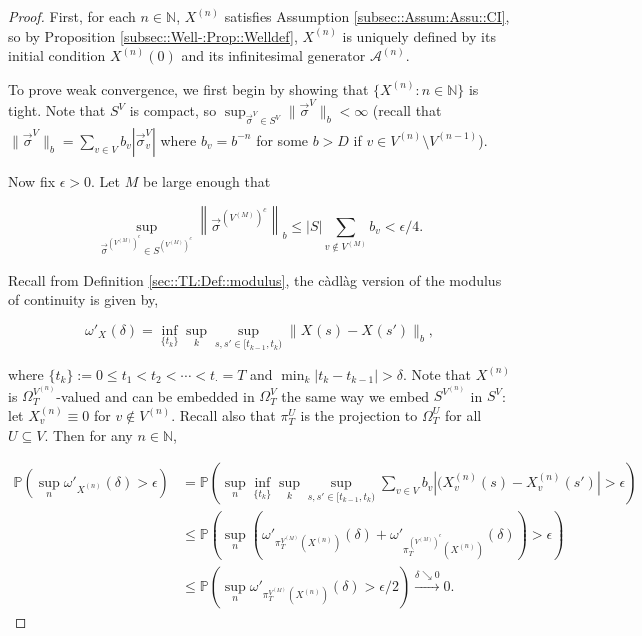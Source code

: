 \documentclass[12pt]{article}
\newcommand{\mb}{\mathbb}
\newcommand{\mc}{\mathcal}
\newcommand{\ra}{\rightarrow}
\newcommand{\os}{\overset}
\newcommand{\ep}{\epsilon}
\newcommand{\ind}{\hspace{24pt}}
\newcommand{\pr}{\mb{P}}							%
\renewcommand{\v}{v}							%
\renewcommand{\U}{U}							%
\renewcommand{\S}{S}							%
\newcommand{\s}{\sigma}							%
\newcommand{\sv}{\vec{\s}}						%
\renewcommand{\b}{b}							%
\newcommand{\T}{T}								%
\renewcommand{\t}{t}							%
\newcommand{\sset}{\Omega}						%
\newcommand{\proj}{\pi}							%
\renewcommand{\tt}{s}							%
\newcommand{\ttt}{s'}							%
\newcommand{\X}{X}								%
\newcommand{\IG}{\mc{A}}						%
\newcommand{\carp}[1]{^{#1}}					%
\newcommand{\vsi}[1]{^{#1}}						%
\newcommand{\cind}[1]{_{#1}}					%
\newcommand{\tp}[1]{(#1)}						%
\newcommand{\tip}[1]{#1}						%
\newcommand{\ts}[1]{_{#1}}						%
\newcommand{\degr}{D}							%
\newcommand{\sln}[1]{^{(#1)}}						%
\newcommand{\cconst}{M}							%
\newcommand{\cmodu}{\omega'}					%
\newcommand{\pra}[1]{_{#1}}						%
\newcommand{\indx}[1]{_{#1}}					%
\renewcommand{\it}{k}							%
\begin{document}
\begin{proof}
First, for each \(n\in\mb{N}\), \(\X\sln{n}\cind{}\tip{}\) satisfies Assumption \ref{subsec::Assum:Assu::CI}, so by Proposition \ref{subsec::Well-:Prop::Welldef}, \(\X\sln{n}\cind{}\tip{}\) is uniquely defined by its initial condition \(\X\sln{n}\cind{}\tp{0}\) and its infinitesimal generator \(\IG\sln{n}\).

\ind To prove weak convergence, we first begin by showing that \(\{\X\sln{n}\cind{}\tip{}:n\in \mb{N}\}\) is tight. Note that \(\S\carp{V}\) is compact, so \(\sup_{\sv\cind{}\vsi{V} \in \S\carp{V}} \|\sv\cind{}\vsi{V}\|_{\b} < \infty\) (recall that \(\|\sv\cind{}\vsi{V}\|_{\b} = \sum_{\v \in V} \b\cind{\v} |\sv\cind{\v}\vsi{V}|\) where \(\b\cind{\v} = \b^{-n}\) for some \(\b > \degr\) if \(\v \in V\sln{n}\setminus V\sln{n-1}\)).

\ind Now fix \(\ep > 0\). Let \(\cconst\) be large enough that

\[\sup_{\sv\cind{}\vsi{\left(V\sln{\cconst}\right)^c} \in \S\carp{\left(V\sln{\cconst}\right)^c}} \left\|\sv\cind{}\vsi{\left(V\sln{\cconst}\right)^c}\right\|_{\b} \leq |\S|\sum_{\v \notin V\sln{\cconst}} \b\cind{\v} < \ep/4.\]

Recall from Definition \ref{sec::TL:Def::modulus}, the c\`adl\`ag version of the modulus of continuity is given by,

\[\cmodu\pra{\X\cind{}\tip{}}(\delta) = \inf_{\{\t\indx{\it}\}} \sup_\it \sup_{\tt,\ttt \in [\t\indx{\it-1},\t\indx{\it})} \|\X\cind{}\tp{\tt} - \X\cind{}\tp{\ttt}\|_{\b},\]

where \(\{\t\indx{\it}\} := 0 \leq \t\indx{1} < \t\indx{2} < \cdots < \t\indx{\cdot} = \T\) and \(\min_\it|\t\indx{\it} - \t\indx{\it-1}| > \delta\). Note that \(\X\sln{n}\cind{}\tip{}\) is \(\sset\vsi{V\sln{n}}\ts{\T}\)-valued and can be embedded in \(\sset\vsi{V}\ts{\T}\) the same way we embed \(\S\carp{V\sln{n}}\) in \(\S\carp{V}\): let \(\X\sln{n}\cind{\v}\tip{} \equiv 0\) for \(\v \notin V\sln{n}\). Recall also that \(\proj\vsi{\U}\ts{\T}\) is the projection to \(\sset\vsi{\U}\ts{\T}\) for all \(\U\subseteq V\). Then for any \(n\in \mb{N}\),

\begin{align*}
\pr\left(\sup_n \cmodu\pra{\X\sln{n}\cind{}\tip{}}(\delta) > \epsilon\right) &= \pr\left(\sup_n\inf_{\{\t\indx{\it}\}}\sup_\it\sup_{\tt,\ttt \in [\t\indx{\it-1},\t\indx{\it})} \sum_{\v \in V} \b\cind{\v}|(\X\sln{n}\cind{\v}\tp{\tt} - \X\sln{n}\cind{\v}\tp{\ttt}| > \epsilon \right)\\
&\leq \pr\left(\sup_n \left(\cmodu\pra{\proj\vsi{V\sln{\cconst}}\ts{\T}(\X\sln{n}\cind{}\tip{})}(\delta) + \cmodu\pra{\proj\vsi{\left(V\sln{\cconst}\right)^c}\ts{\T}(\X\sln{n}\cind{}\tip{})}(\delta)\right) > \ep\right)\\
&\leq \pr\left(\sup_n \cmodu\pra{\proj\vsi{V\sln{\cconst}}\ts{\T}(\X\sln{n}\cind{}\tip{})}(\delta) > \ep/2\right) \os{\delta\searrow 0}{\ra} 0.
\end{align*}


\end{proof}
\end{document}
